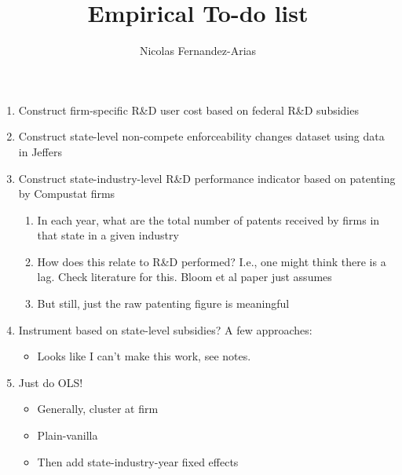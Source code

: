 \documentclass[12pt,english]{article}
\theoremstyle{remark}
\begin{document}
	
\title{Empirical To-do list}
\author{Nicolas Fernandez-Arias}
\maketitle

\begin{enumerate}
	\item Construct firm-specific R\&D user cost based on federal R\&D subsidies
	\item Construct state-level non-compete enforceability changes dataset using data in Jeffers
	\item Construct state-industry-level R\&D performance indicator based on patenting by Compustat firms
	\begin{enumerate}
		\item In each year, what are the total number of patents received by firms in that state in a given industry
		\item How does this relate to R\&D performed? I.e., one might think there is a lag. Check literature for this. Bloom et al paper just assumes 
		\item But still, just the raw patenting figure is meaningful
	\end{enumerate}
	\item Instrument based on state-level subsidies? A few approaches:
	\begin{itemize}
		\item Looks like I can't make this work, see notes. 
	\end{itemize}
	\item Just do OLS!
	\begin{itemize}
		\item Generally, cluster at firm
		\item Plain-vanilla
		\item Then add state-industry-year fixed effects
	\end{itemize}
\end{enumerate}
\end{document}
